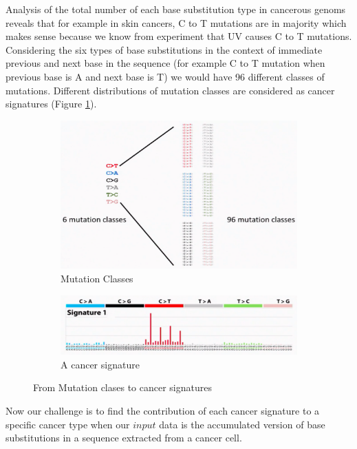 \documentclass[12pt]{article}
\begin{document}
Analysis of the total number of each base substitution type in cancerous genoms reveals that for example in skin cancers, C to T mutations are in majority which makes sense because we know from experiment that UV causes C to T mutations. Considering the six types of base substitutions in the context of immediate previous and next base in the sequence (for example C to T mutation when previous base is A and next base is T) we would have 96 different classes of mutations. Different distributions of mutation classes are considered as cancer signatures (Figure \ref{fig:sig}).
\begin{figure}[h!]
  \centering  
  \begin{subfigure}[b]{0.5\linewidth}
    \includegraphics[width=\linewidth]{./images/sig.png}
    \caption{Mutation Classes}
  \end{subfigure}
  \begin{subfigure}[b]{0.5\linewidth}
    \includegraphics[width=\linewidth]{./images/sig2.png}
    \caption{A cancer signature}
  \end{subfigure}
  \caption{From Mutation clases to cancer signatures}
  \label{fig:sig}
\end{figure}

Now our challenge is to find the contribution of each cancer signature to a specific cancer type when our $input$ data is the accumulated version of base substitutions in a sequence extracted from a cancer cell.
\end{document}
